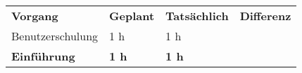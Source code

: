\begin{tabular}{llll}
    \rowcolor{heading}\textbf{Vorgang} & \textbf{Geplant} & \textbf{Tatsächlich} & \textbf{Differenz} \\
    \rowcolor{odd}Benutzerschulung & 1 h & 1 h &  \\
    \hline
    \hline
    \rowcolor{heading}\textbf{Einführung} & \textbf{1 h} & \textbf{1 h} & \textbf{} \\
\end{tabular}
